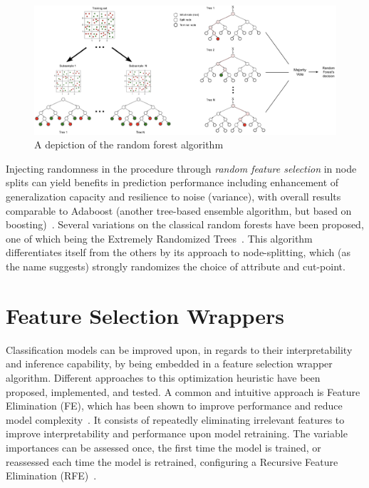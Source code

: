 \begin{figure}[H]
    \caption{A depiction of the random forest algorithm}
    \centerline{\includegraphics[scale=.27]{fig_random_forest.png}}
    \label{fig:random-forest}
\end{figure}

Injecting randomness in the procedure through \textit{random feature selection} in node splits can yield benefits in prediction performance including enhancement of generalization capacity and resilience to noise (variance), with overall results comparable to Adaboost (another tree-based ensemble algorithm, but based on boosting)~\cite{Breiman2001}.
Several variations on the classical random forests have been proposed, one of which being the Extremely Randomized Trees~\cite{Geurts2006}.
This algorithm differentiates itself from the others by its approach to node-splitting, which (as the name suggests) strongly randomizes the choice of attribute and cut-point.


\section{Feature Selection Wrappers}

Classification models can be improved upon, in regards to their interpretability and inference capability, by being embedded in a feature selection wrapper algorithm.
Different approaches to this optimization heuristic have been proposed, implemented, and tested.
A common and intuitive approach is Feature Elimination (FE), which has been shown to improve performance and reduce model complexity~\cite{Svetnik2004, Guyon2002}.
It consists of repeatedly eliminating irrelevant features to improve interpretability and performance upon model retraining.
The variable importances can be assessed once, the first time the model is trained, or reassessed each time the model is retrained, configuring a Recursive Feature Elimination (RFE)~\cite{Svetnik2004}.

